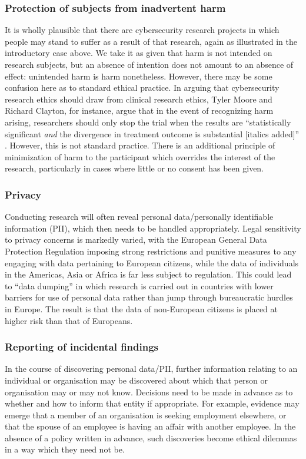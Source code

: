\documentclass{svjour3}                     %
\begin{document}
\subsubsection{Protection of subjects from inadvertent harm}
It is wholly plausible that there are cybersecurity research projects in which people may stand to suffer as a result of that research, again as illustrated in the introductory case above. We take it as given that harm is not intended on research subjects, but an absence of intention does not amount to an absence of effect: unintended harm is harm nonetheless. However, there may be some confusion here as to standard ethical practice. In arguing that cybersecurity research ethics should draw from clinical research ethics, Tyler Moore and Richard Clayton, for instance, argue that in the event of recognizing harm arising, researchers should only stop the trial when the results are ``statistically significant \emph{and} the divergence in treatment outcome is substantial [italics added]'' \cite[p.~15]{moore2011ethical}. However, this is not standard practice. There is an additional principle of minimization of harm to the participant which overrides the interest of the research, particularly in cases where little or no consent has been given.

\subsubsection{Privacy}
Conducting research will often reveal personal data/personally identifiable information (PII), which then needs to be handled appropriately. Legal sensitivity to privacy concerns is markedly varied, with the European General Data Protection Regulation imposing strong restrictions and punitive measures to any engaging with data pertaining to European citizens, while the data of individuals in the Americas, Asia or Africa is far less subject to regulation. This could lead to ``data dumping'' in which research is carried out in countries with lower barriers for use of personal data rather than jump through bureaucratic hurdles in Europe.  The result is that the data of non-European citizens is placed at higher risk than that of Europeans.

\subsubsection{Reporting of incidental findings}
In the course of discovering personal data/PII, further information relating to an individual or organisation may be discovered about which that person or organisation may or may not know.  Decisions need to be made in advance as to whether and how to inform that entity if appropriate. For example, evidence may emerge that a member of an organisation is seeking employment elsewhere, or that the spouse of an employee is having an affair with another employee. In the absence of a policy written in advance, such discoveries become ethical dilemmas in a way which they need not be.
\end{document}
